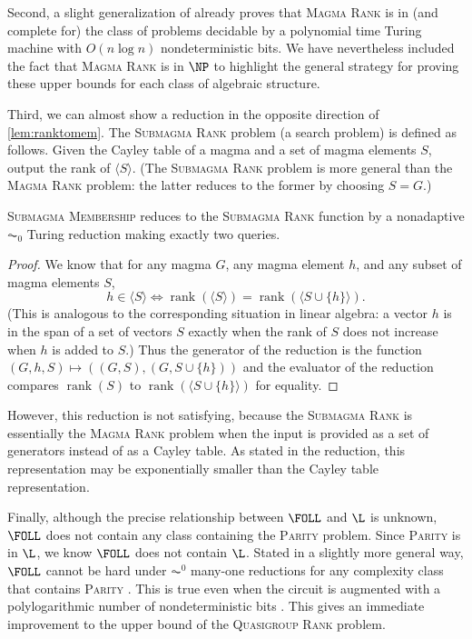 \documentclass{article}
\newcommand{\gen}[1]{\langle #1 \rangle}
\DeclareMathOperator{\rank}{rank}
\begin{document}
Second, a slight generalization of \autocite[Theorem~7]{py96} already proves that \textsc{Magma Rank} is in (and complete for) the class of problems decidable by a polynomial time Turing machine with $O(n \log n)$ nondeterministic bits.
We have nevertheless included the fact that \textsc{Magma Rank} is in $\NP$ to highlight the general strategy for proving these upper bounds for each class of algebraic structure.

Third, we can almost show a reduction in the opposite direction of \autoref{lem:ranktomem}.
The \textsc{Submagma Rank} problem (a search problem) is defined as follows.
Given the Cayley table of a magma and a set of magma elements $S$, output the rank of $\gen{S}$.
(The \textsc{Submagma Rank} problem is more general than the \textsc{Magma Rank} problem: the latter reduces to the former by choosing $S = G$.)

\begin{proposition}
  \textsc{Submagma Membership} reduces to the \textsc{Submagma Rank} function by a nonadaptive $\AC_0$ Turing reduction making exactly two queries.
\end{proposition}
\begin{proof}
  We know that for any magma $G$, any magma element $h$, and any subset of magma elements $S$,
  \begin{equation*}
    h \in \gen{S} \iff \rank(\gen{S}) = \rank(\gen{S \cup \{h\}}).
  \end{equation*}
  (This is analogous to the corresponding situation in linear algebra: a vector $h$ is in the span of a set of vectors $S$ exactly when the rank of $S$ does not increase when $h$ is added to $S$.)
  Thus the generator of the reduction is the function $(G, h, S) \mapsto ((G, S), (G, S \cup \{h\}))$ and the evaluator of the reduction compares $\rank({S})$ to $\rank(\gen{S \cup \{h\}})$ for equality.
\end{proof}

However, this reduction is not satisfying, because the \textsc{Submagma Rank} is essentially the \textsc{Magma Rank} problem when the input is provided as a set of generators instead of as a Cayley table.
As stated in the reduction, this representation may be exponentially smaller than the Cayley table representation.

Finally, although the precise relationship between $\FOLL$ and $\L$ is unknown, $\FOLL$ does not contain any class containing the \textsc{Parity} problem.
Since \textsc{Parity} is in $\L$, we know $\FOLL$ does not contain $\L$.
Stated in a slightly more general way, $\FOLL$ cannot be hard under $\AC^0$ many-one reductions for any complexity class that contains \textsc{Parity} \cite[Proposition~2.1]{bklm01}.
This is true even when the circuit is augmented with a polylogarithmic number of nondeterministic bits \cite[Section~4]{ctw13}.
This gives an immediate improvement to the upper bound of the \textsc{Quasigroup Rank} problem.
\end{document}
